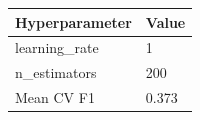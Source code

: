 \begin{tabular}{ll}
\toprule
Hyperparameter & Value \\
\midrule
learning\_rate & 1 \\
n\_estimators & 200 \\
\midrule
Mean CV F1 & 0.373 \\
\bottomrule
\end{tabular}
